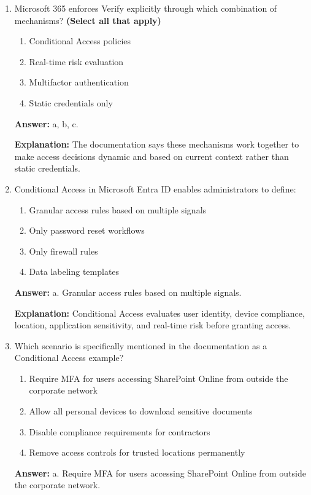 \documentclass[10pt]{article}
\begin{document}
\begin{enumerate}[leftmargin=*]
\item Microsoft 365 enforces Verify explicitly through which combination of mechanisms? \textbf{(Select all that apply)}
\begin{enumerate}[label=\alph*., leftmargin=1.5em]
\item Conditional Access policies
\item Real-time risk evaluation
\item Multifactor authentication
\item Static credentials only
\end{enumerate}
\textbf{Answer:} a, b, c.

\textbf{Explanation:} The documentation says these mechanisms work together to make access decisions dynamic and based on current context rather than static credentials.

\item Conditional Access in Microsoft Entra ID enables administrators to define:
\begin{enumerate}[label=\alph*., leftmargin=1.5em]
\item Granular access rules based on multiple signals
\item Only password reset workflows
\item Only firewall rules
\item Data labeling templates
\end{enumerate}
\textbf{Answer:} a. Granular access rules based on multiple signals.

\textbf{Explanation:} Conditional Access evaluates user identity, device compliance, location, application sensitivity, and real-time risk before granting access.

\item Which scenario is specifically mentioned in the documentation as a Conditional Access example?
\begin{enumerate}[label=\alph*., leftmargin=1.5em]
\item Require MFA for users accessing SharePoint Online from outside the corporate network
\item Allow all personal devices to download sensitive documents
\item Disable compliance requirements for contractors
\item Remove access controls for trusted locations permanently
\end{enumerate}
\textbf{Answer:} a. Require MFA for users accessing SharePoint Online from outside the corporate network.


\end{enumerate}
\end{document}
